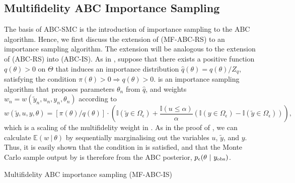 \documentclass[review,demo]{siamonline190516}
\begin{document}
\subsection{Multifidelity ABC Importance Sampling}
\label{s:MF-ABC-IS}

The basis of ABC-SMC is the introduction of importance sampling to the ABC algorithm.
Hence, we first discuss the extension of  (MF-ABC-RS) to an importance sampling algorithm.
The extension will be analogous to the extension of  (ABC-RS) into  (ABC-IS).
As in , suppose that there exists a positive function $q(\theta)>0$ on $\Theta$ that induces an importance distribution $\hat q(\theta) = q(\theta)/Z_q$, satisfying the condition $\pi(\theta)>0 \Rightarrow q(\theta)>0$.
 is an importance sampling algorithm that proposes parameters $\theta_n$ from $\hat q$, and weights $w_n = w(\tilde y_n, u_n, y_n, \theta_n)$ according to
\begin{equation}
\label{eq:qw_mf}
 w(\tilde y, u, y, \theta) 
 =
 \left[ \pi(\theta) \big/ q(\theta) \right] \cdot 
 \left( \mathbb I(\tilde y \in \Omega_\epsilon) + \frac{\mathbb I(u \leq \alpha)}{\alpha} \left( \mathbb I(y \in \Omega_\epsilon) - \mathbb I(\tilde y \in \Omega_\epsilon) \right) \right),
\end{equation}
which is a scaling of the multifidelity weight in .
As in the proof of , we can calculate $\mathbb E(w~|~\theta)$ by sequentially marginalising out the variables $u$, $\tilde y$, and $y$.
Thus, it is easily shown that the condition in  is satisfied, and that the Monte Carlo sample output by  is therefore from the ABC posterior, $p_\epsilon(\theta~|~y_{\mathrm{obs}})$.

\begin{algorithm}
\caption{Multifidelity ABC importance sampling (MF-ABC-IS)}
\label{MFABC:Importance}
\begin{algorithmic}[1]
\REPEAT{}
 \ENDIF{}
\end{algorithmic}
\end{algorithm}
\end{document}
